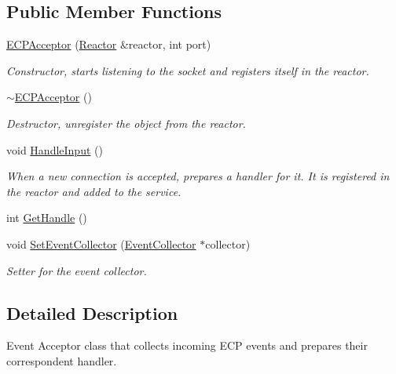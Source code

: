 \subsection*{Public Member Functions}
\begin{DoxyCompactItemize}
\item 
\hyperlink{class_e_c_p_acceptor_ad0022e1f2544ad417ba49b89336c8f3b}{E\-C\-P\-Acceptor} (\hyperlink{class_common_1_1_reactor}{Reactor} \&reactor, int port)
\begin{DoxyCompactList}\small\item\em Constructor, starts listening to the socket and registers itself in the reactor. \end{DoxyCompactList}\item 
\hypertarget{class_e_c_p_acceptor_aa07b436fe534243a611ee103822a02de}{\hyperlink{class_e_c_p_acceptor_aa07b436fe534243a611ee103822a02de}{$\sim$\-E\-C\-P\-Acceptor} ()}\label{class_e_c_p_acceptor_aa07b436fe534243a611ee103822a02de}

\begin{DoxyCompactList}\small\item\em Destructor, unregister the object from the reactor. \end{DoxyCompactList}\item 
\hypertarget{class_e_c_p_acceptor_afd5c66610d9f62f6c4c40ebeb989167f}{void \hyperlink{class_e_c_p_acceptor_afd5c66610d9f62f6c4c40ebeb989167f}{Handle\-Input} ()}\label{class_e_c_p_acceptor_afd5c66610d9f62f6c4c40ebeb989167f}

\begin{DoxyCompactList}\small\item\em When a new connection is accepted, prepares a handler for it. It is registered in the reactor and added to the service. \end{DoxyCompactList}\item 
int \hyperlink{class_e_c_p_acceptor_a8ab038f08faff45c8e7b1ca77f543c40}{Get\-Handle} ()
\item 
void \hyperlink{class_e_c_p_acceptor_a4f6041e4537d591aa0349e641518e4b3}{Set\-Event\-Collector} (\hyperlink{class_event_collector}{Event\-Collector} $\ast$collector)
\begin{DoxyCompactList}\small\item\em Setter for the event collector. \end{DoxyCompactList}\end{DoxyCompactItemize}


\subsection{Detailed Description}
Event Acceptor class that collects incoming E\-C\-P events and prepares their correspondent handler. 


